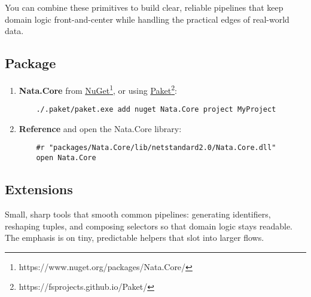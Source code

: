 \documentclass{article}
\begin{document}
\noindent You can combine these primitives to build clear, reliable pipelines that keep domain logic front-and-center while handling the practical edges of real-world data.

\subsection{Package}

\begin{enumerate}
    
    \item\textbf{Nata.Core} from \href{https://www.nuget.org/packages/Nata.Core/}{NuGet}\footnote{https://www.nuget.org/packages/Nata.Core/}, or using \href{https://fsprojects.github.io/Paket/}{Paket}\footnote{https://fsprojects.github.io/Paket/}:
    \begin{verbatim}
    ./.paket/paket.exe add nuget Nata.Core project MyProject
    \end{verbatim}
    
    \item\textbf{Reference} and open the Nata.Core library:
    \begin{verbatim}
    #r "packages/Nata.Core/lib/netstandard2.0/Nata.Core.dll"
    open Nata.Core
    \end{verbatim}
\end{enumerate}

\subsection{Extensions}

Small, sharp tools that smooth common pipelines: generating identifiers, reshaping tuples, and composing selectors so that domain logic stays readable. The emphasis is on tiny, predictable helpers that slot into larger flows.
\end{document}
